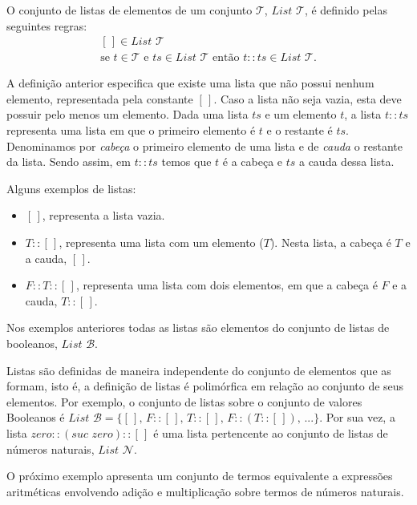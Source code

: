 \begin{Definition}
  O conjunto de listas de elementos de um conjunto $\mathcal{T}$, $\textit{List }\mathcal{T}$, \'e definido pelas seguintes regras:
  \[
  \begin{array}{l}
    [\,] \in \textit{List }\mathcal{T}\\
    \text{se }t \in \mathcal{T} \text{ e } ts \in \textit{List }\mathcal{T}\text{ ent\~ao } t :: ts \in \textit{List }\mathcal{T}.
  \end{array}
  \]
\end{Definition}
A defini\c{c}\~ao anterior especifica que existe uma lista que n\~ao possui nenhum elemento, representada pela constante $[\,]$. Caso a lista
n\~ao seja vazia, esta deve possuir pelo menos um elemento. Dada uma lista $ts$ e um elemento $t$, a lista $t :: ts$ representa uma
lista em que o primeiro elemento \'e $t$ e o restante \'e $ts$. Denominamos por \textit{cabe\c{c}a} o primeiro elemento de uma lista
e de \textit{cauda} o restante da lista. Sendo assim, em $t :: ts$ temos que $t$ \'e a cabe\c{c}a e $ts$ a cauda dessa lista.

\begin{Example}
Alguns exemplos de listas:
\begin{itemize}
  \item $[\,]$, representa a lista vazia.
  \item $T :: [\,]$, representa uma lista com um elemento ($T$). Nesta lista, a cabe\c{c}a \'e $T$ e a cauda, $[\,]$.
  \item $F :: T :: [\,]$, representa uma lista com dois elementos, em que a cabe\c{c}a \'e $F$ e a cauda, $T :: [\,]$.
\end{itemize}
Nos exemplos anteriores todas as listas s\~ao elementos do conjunto de listas de booleanos, $\textit{List }\mathcal{B}$.
\end{Example}

Listas s\~ao definidas de maneira independente do conjunto de elementos que as formam, isto \'e, a defini\c{c}\~ao de listas
\'e polim\'orfica em rela\c{c}\~ao ao conjunto de seus elementos.
Por exemplo, o conjunto de listas sobre 
o conjunto de valores Booleanos \'e $\textit{List }\mathcal{B}=\{[\,],\,F :: [\,],\,T :: [\,],\, F :: (T :: [\,]),\, ...\}$. Por sua vez, a lista
$zero :: (suc\,\,zero) :: [\,]$ \'e uma lista pertencente ao conjunto de listas de n\'umeros naturais, $\textit{List }\mathcal{N}$.

O pr\'oximo exemplo apresenta um conjunto de termos equivalente a express\~oes aritm\'eticas envolvendo adi\c{c}\~ao e multiplica\c{c}\~ao
sobre termos de n\'umeros naturais.

